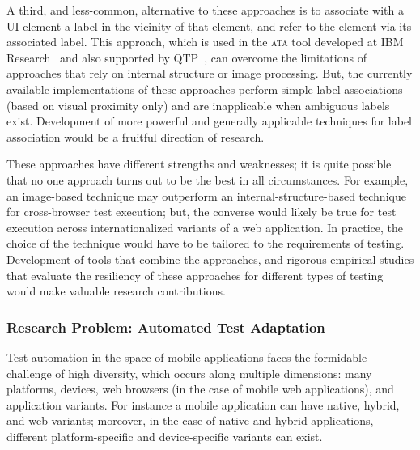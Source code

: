 A third, and less-common, alternative to these approaches is to associate with a
UI element a label in the vicinity of that element, and refer to the element via
its associated label. This approach, which is used in the \textsc{ata} tool
developed at IBM Research~\cite{thummalapenta:2012b, thummalapenta:2012a,
  thummalapenta:2013a} and also supported by QTP~\cite{hpqtp}, can overcome the
limitations of approaches that rely on internal structure or image
processing. But, the currently available implementations of these approaches
perform simple label associations (based on visual proximity only) and are
inapplicable when ambiguous labels exist. Development of more powerful and
generally applicable techniques for label association would be a fruitful
direction of research.

These approaches have different strengths and weaknesses; it is quite possible
that no one approach turns out to be the best in all circumstances. For example,
an image-based technique may outperform an internal-structure-based technique
for cross-browser test execution; but, the converse would likely be true for
test execution across internationalized variants of a web application. In
practice, the choice of the technique would have to be tailored to the
requirements of testing.  Development of tools that combine the approaches, and
rigorous empirical studies that evaluate the resiliency of these approaches for
different types of testing would make valuable research contributions.


\subsubsection*{Research Problem: Automated Test Adaptation}

Test automation in the space of mobile applications faces the form\-idable
challenge of high diversity, which occurs along multiple dimensions: many
platforms, devices, web browsers (in the case of mobile web applications), and
application variants. For instance a mobile application can have native, hybrid,
and web variants; moreover, in the case of native and hybrid applications,
different platform-specific and device-specific variants can exist.

